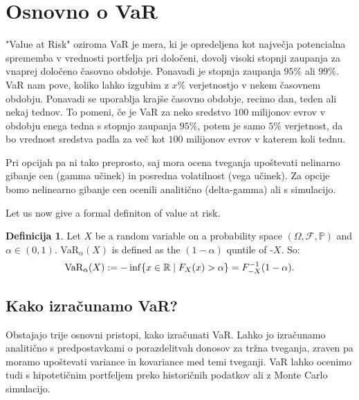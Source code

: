 \documentclass[a4paper, 12pt]{article}
\theoremstyle{definition}
\newtheorem{definicija}{Definicija}
\theoremstyle{plain}
\newcommand{\R}{\mathbb R}
\newcommand{\f}{\mathcal F}
\newcommand{\p}{\mathbb P}
\begin{document}



\section{Osnovno o VaR}

"Value at Risk" oziroma VaR je mera, ki je opredeljena kot največja potencialna sprememba v vrednosti portfelja pri določeni,
dovolj visoki stopnji zaupanja za vnaprej določeno časovno obdobje. Ponavadi je stopnja zaupanja $95\%$ ali $99\%$.
VaR nam pove, koliko lahko izgubim z $x\%$ verjetnostjo v nekem časovnem obdobju. Ponavadi se uporablja
krajše časovno obdobje, recimo dan, teden ali nekaj tednov.
To pomeni, če je VaR za neko sredstvo $100$ milijonov evrov v obdobju enega tedna s stopnjo zaupanja $95\%$,
potem je samo $5\%$ verjetnost, da bo vrednost sredstva padla za več kot $100$ milijonov evrov v katerem koli tednu.

Pri opcijah pa ni tako preprosto, saj mora ocena tveganja  upoštevati nelinarno gibanje cen (gamma učinek)
in posredna volatilnost (vega učinek). %
Za opcije bomo nelinearno gibanje cen ocenili analitično (delta-gamma) ali s simulacijo. 

Let us now give a formal definiton of value at risk. 
\begin{definicija}
Let $X$ be a random variable on a probability space $(\Omega, \f, \p)$ and $\alpha \in (0, 1)$.
VaR$_\alpha(X)$ is defined as the $(1-\alpha)$ quntile of -$X$. So:
$$
\textnormal{VaR}_\alpha(X) := - \inf \{ x \in \R \mid F_X(x) > \alpha \} = F^{-1}_{-X}(1-\alpha).
$$
\end{definicija}


\subsection{Kako izračunamo VaR?}

Obstajajo trije osnovni pristopi, kako izračunati VaR. Lahko jo izračunamo analitično
s predpostavkami o porazdelitvah donosov za tržna tveganja, zraven pa moramo upoštevati variance
in kovariance med temi tveganji. VaR lahko ocenimo tudi s hipotetičnim portfeljem preko historičnih 
podatkov ali z Monte Carlo simulacijo. 
\end{document}
